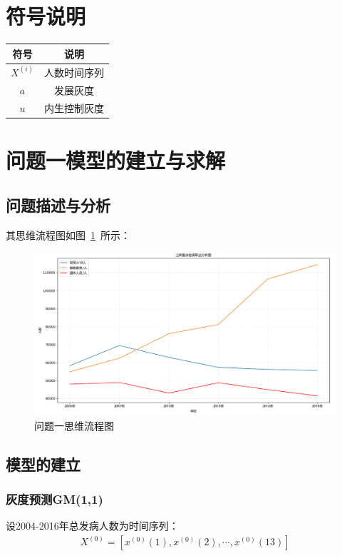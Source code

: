 \documentclass{whutmod}
\begin{document}
	\section{符号说明}
	\begin{table}[H]
	\label{biao} \centering
	\begin{tabular}{cc}
		\toprule[1.5pt]
		\multicolumn{1}{m{5cm}}{\centering 符号} & \multicolumn{1}{m{5cm}}{\centering 说明} \\
		\midrule[0.5pt]		
		$X^{(i)}$  & 人数时间序列  \\ 
		$a$  &  发展灰度 \\ 
		$u$  &  内生控制灰度\\
		\bottomrule[1.5pt]
	\end{tabular}
\end{table}

	\section{问题一模型的建立与求解}
    \subsection{问题描述与分析}

    其思维流程图如图~\ref{lct}~所示：

       \begin{figure}[H]
	   	\centering
	   	\includegraphics[width=\textwidth]{figures/sanrenf.png}
	   	\caption{问题一思维流程图}\label{lct}
	   \end{figure}

   
	    \subsection{模型的建立}
	    \subsubsection{灰度预测GM(1,1)}
	    设2004-2016年总发病人数为时间序列：
	     \begin{gather*}
	    X^{(0)}=[x^{(0)}(1),x^{(0)}(2),\cdots,x^{(0)}(13)]
	    \end{gather*}
	    
\end{document}
